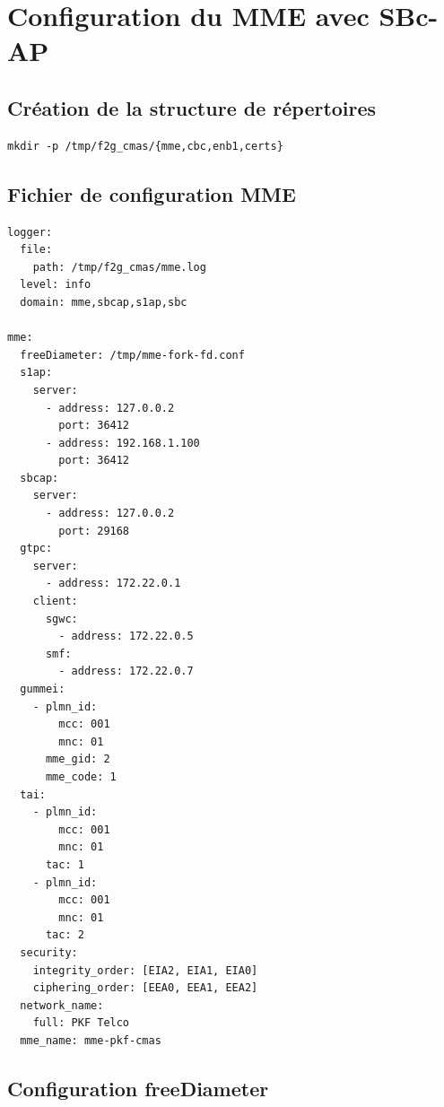 \documentclass[11pt,a4paper]{article}
\begin{document}
\section{Configuration du MME avec SBc-AP}

\subsection{Création de la structure de répertoires}

\begin{cmdbox}
\begin{lstlisting}[style=bashstyle]
mkdir -p /tmp/f2g_cmas/{mme,cbc,enb1,certs}
\end{lstlisting}
\end{cmdbox}

\subsection{Fichier de configuration MME}

\begin{filebox}
\begin{lstlisting}[style=yamlstyle]
logger:
  file:
    path: /tmp/f2g_cmas/mme.log
  level: info
  domain: mme,sbcap,s1ap,sbc

mme:
  freeDiameter: /tmp/mme-fork-fd.conf
  s1ap:
    server:
      - address: 127.0.0.2
        port: 36412
      - address: 192.168.1.100
        port: 36412
  sbcap:
    server:
      - address: 127.0.0.2
        port: 29168
  gtpc:
    server:
      - address: 172.22.0.1
    client:
      sgwc:
        - address: 172.22.0.5
      smf:
        - address: 172.22.0.7
  gummei:
    - plmn_id:
        mcc: 001
        mnc: 01
      mme_gid: 2
      mme_code: 1
  tai:
    - plmn_id:
        mcc: 001
        mnc: 01
      tac: 1
    - plmn_id:
        mcc: 001
        mnc: 01
      tac: 2
  security:
    integrity_order: [EIA2, EIA1, EIA0]
    ciphering_order: [EEA0, EEA1, EEA2]
  network_name:
    full: PKF Telco
  mme_name: mme-pkf-cmas
\end{lstlisting}
\end{filebox}

\newpage

\subsection{Configuration freeDiameter}
\end{document}
